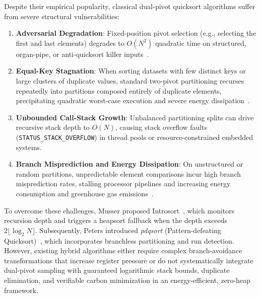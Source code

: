 \documentclass[journal]{IEEEtran}
\begin{document}
Despite their empirical popularity, classical dual-pivot quicksort algorithms suffer from severe structural vulnerabilities:
\begin{enumerate}
    \item \textbf{Adversarial Degradation}: Fixed-position pivot selection (e.g., selecting the first and last elements) degrades to $O(N^2)$ quadratic time on structured, organ-pipe, or anti-quicksort killer inputs~\cite{musser1997introspective}.
    \item \textbf{Equal-Key Stagnation}: When sorting datasets with few distinct keys or large clusters of duplicate values, standard two-pivot partitioning recurses repeatedly into partitions composed entirely of duplicate elements, precipitating quadratic worst-case execution and severe energy dissipation~\cite{eloutmani2025energy,yang2025holistic}.
    \item \textbf{Unbounded Call-Stack Growth}: Unbalanced partitioning splits can drive recursive stack depth to $O(N)$, causing stack overflow faults (\texttt{STATUS\_STACK\_OVERFLOW}) in thread pools or resource-constrained embedded systems.
    \item \textbf{Branch Misprediction and Energy Dissipation}: On unstructured or random partitions, unpredictable element comparisons incur high branch misprediction rates, stalling processor pipelines and increasing energy consumption and greenhouse gas emissions~\cite{edelkamp2019blockquicksort,sciencedirect2025fastergreener,greenai2025languages,pathania2025calculating}.
\end{enumerate}

To overcome these challenges, Musser proposed Introsort~\cite{musser1997introspective}, which monitors recursion depth and triggers a heapsort fallback when the depth exceeds $2 \lfloor \log_2 N \rfloor$. Subsequently, Peters introduced \textit{pdqsort} (Pattern-defeating Quicksort)~\cite{peters2015pdqsort}, which incorporates branchless partitioning and run detection. However, existing hybrid algorithms either require complex branch-avoidance transformations that increase register pressure or do not systematically integrate dual-pivot sampling with guaranteed logarithmic stack bounds, duplicate elimination, and verifiable carbon minimization in an energy-efficient, zero-heap framework.
\end{document}
